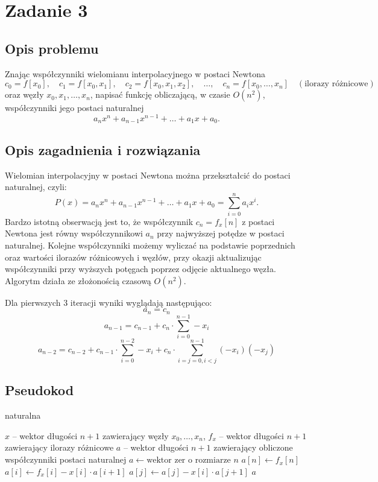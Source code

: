 \documentclass{article}
\begin{document}
\section{Zadanie 3}
\subsection{Opis problemu}
Znając współczynniki wielomianu interpolacyjnego w postaci Newtona
\[
c_0 = f[x_0], \quad c_1 = f[x_0, x_1], \quad c_2 = f[x_0, x_1, x_2], \quad \dots, \quad c_n = f[x_0, \dots, x_n] \quad (\text{ilorazy różnicowe})
\]
oraz węzły \(x_0, x_1, \dots, x_n\), napisać funkcję obliczającą, w czasie \(O(n^2)\), współczynniki jego postaci naturalnej
\[
a_n x^n + a_{n-1} x^{n-1} + \dots + a_1 x + a_0.
\]

\subsection{Opis zagadnienia i rozwiązania}
Wielomian interpolacyjny w postaci Newtona można przekształcić do postaci naturalnej, czyli:
\[
P(x) = a_n x^n + a_{n-1} x^{n-1} + \dots + a_1 x + a_0 = \sum_{i=0}^n a_i x^i.
\]
Bardzo istotną obserwacją jest to, że współczynnik $c_n = f_x[n]$ z postaci Newtona jest równy współczynnikowi $a_n$ przy najwyższej potędze w postaci naturalnej.
Kolejne współczynniki możemy wyliczać na podstawie poprzednich oraz wartości ilorazów różnicowych i węzłów, przy okazji aktualizując współczynniki przy wyższych potęgach poprzez odjęcie aktualnego węzła.
Algorytm działa ze złożonością czasową \( O(n^2) \).

Dla pierwszych 3 iteracji wyniki wyglądają następująco:
$$a_n = c_n$$
$$a_{n-1} = c_{n-1} + c_n \cdot \sum_{i=0}^{n-1}-x_i$$
$$a_{n-2} = c_{n-2} + c_{n-1} \cdot \sum_{i=0}^{n-2}-x_i + c_{n} \cdot \sum_{i=j=0, i<j}^{n-1}(-x_i) (-x_j)$$

\subsection{Pseudokod}
\begin{algorithm}[H]
\caption{naturalna}
\begin{algorithmic}[1]
\Require $x$ -- wektor długości $n + 1$ zawierający węzły $x_0, \dots, x_n$, $f_x$ -- wektor długości $n + 1$ zawierający ilorazy różnicowe
\Ensure $a$ -- wektor długości $n + 1$ zawierający obliczone współczynniki postaci naturalnej
\State $a \gets \text{wektor zer o rozmiarze } n$
\State $a[n] \gets f_x[n]$
    \State $a[i] \gets f_x[i] - x[i] \cdot a[i+1]$
        \State $a[j] \gets a[j] - x[i] \cdot a[j+1]$
    \EndFor
\EndFor
\State \Return $a$
\end{algorithmic}
\end{algorithm}
\end{document}

